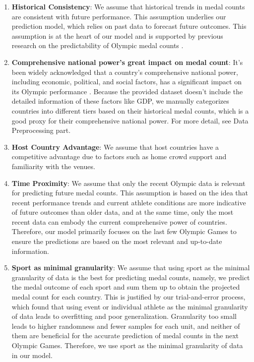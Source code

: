 \documentclass{mcmthesis}
\begin{document}
\begin{enumerate}
    \item \textbf{Historical Consistency}: We assume that historical trends in medal counts are consistent with future performance. This assumption underlies our prediction model, which relies on past data to forecast future outcomes. This assumption is at the heart of our model and is supported by previous research on the predictability of Olympic medal counts \cite{4,5,7}.
    \item \textbf{Comprehensive national power's great impact on medal count}: It's been widely acknowledged that a country's comprehensive national power, including economic, political, and social factors, has a significant impact on its Olympic performance \cite{1,2,3,7}. Because the provided dataset doesn't include the detailed information of these factors like GDP, we manually categorizes countries into different tiers based on their historical medal counts, which is a good proxy for their comprehensive national power. For more detail, see Data Preprocessing part.
    \item \textbf{Host Country Advantage}: We assume that host countries have a competitive advantage due to factors such as home crowd support and familiarity with the venues.
    \item \textbf{Time Proximity}: We assume that only the recent Olympic data is relevant for predicting future medal counts. This assumption is based on the idea that recent performance trends and current athlete conditions are more indicative of future outcomes than older data, and at the same time, only the most recent data can embody the current comprehensive power of countries. Therefore, our model primarily focuses on the last few Olympic Games to ensure the predictions are based on the most relevant and up-to-date information.
    \item \textbf{Sport as minimal granularity}: We assume that using sport as the minimal granularity of data is the best for predicting medal counts, namely, we predict the medal outcome of each sport and sum them up to obtain the projected medal count for each country. This is justified by our trial-and-error process, which found that using event or individual athlete as the minimal granularity of data leads to overfitting and poor generalization.  Granularity too small leads to higher randomness and fewer samples for each unit, and neither of them are beneficial for the accurate prediction of medal counts in the next Olympic Games. Therefore, we use sport as the minimal granularity of data in our model.
\end{enumerate}
\end{document}
